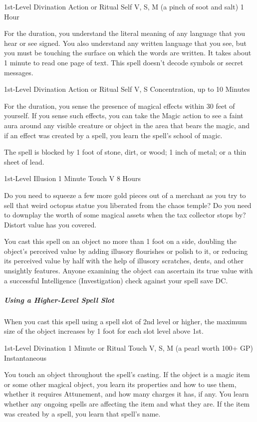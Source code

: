 \documentclass[letterpaper,openany,oneside,twocolumn]{book}
\begin{document}
	{1st-Level Divination}
	{Action or Ritual}
	{Self}
	{V, S, M (a pinch of soot and salt)}
	{1 Hour}

For the duration, you understand the literal meaning of any language that you hear or see signed. You also understand any written language that you see, but you must be touching the surface on which the words are written. It takes about 1 minute to read one page of text. This spell doesn't decode symbols or secret messages.

	{1st-Level Divination}
	{Action or Ritual}
	{Self}
	{V, S}
	{Concentration, up to 10 Minutes}

For the duration, you sense the presence of magical effects within 30 feet of yourself. If you sense such effects, you can take the Magic action to see a faint aura around any visible creature or object in the area that bears the magic, and if an effect was created by a spell, you learn the spell's school of magic.

The spell is blocked by 1 foot of stone, dirt, or wood; 1 inch of metal; or a thin sheet of lead.

	{1st-Level Illusion}
	{1 Minute}
	{Touch}
	{V}
	{8 Hours}

Do you need to squeeze a few more gold pieces out of a merchant as you try to sell that weird octopus statue you liberated from the chaos temple? Do you need to downplay the worth of some magical assets when the tax collector stops by? Distort value has you covered.

You cast this spell on an object no more than 1 foot on a side, doubling the object's perceived value by adding illusory flourishes or polish to it, or reducing its perceived value by half with the help of illusory scratches, dents, and other unsightly features. Anyone examining the object can ascertain its true value with a successful Intelligence (Investigation) check against your spell save DC.

\subparagraph*{Using a Higher-Level Spell Slot} When you cast this spell using a spell slot of 2nd level or higher, the maximum size of the object increases by 1 foot for each slot level above 1st.

	{1st-Level Divination}
	{1 Minute or Ritual}
	{Touch}
	{V, S, M (a pearl worth 100+ GP)}
	{Instantaneous}

You touch an object throughout the spell's casting. If the object is a magic item or some other magical object, you learn its properties and how to use them, whether it requires Attunement, and how many charges it has, if any. You learn whether any ongoing spells are affecting the item and what they are. If the item was created by a spell, you learn that spell's name.
\end{document}
